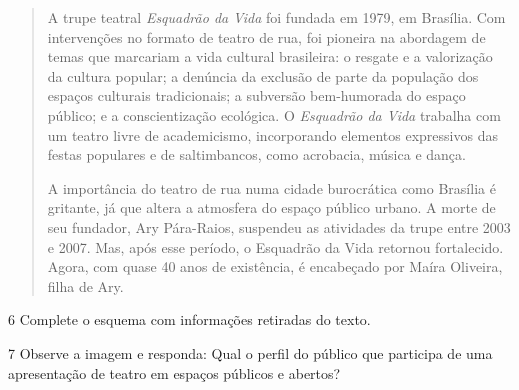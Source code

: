 \begin{quote}
A trupe teatral \emph{Esquadrão da} \emph{Vida} foi fundada em 1979, em
Brasília. Com intervenções no formato de teatro de rua, foi pioneira na
abordagem de temas que marcariam a vida cultural brasileira: o resgate e
a valorização da cultura popular; a denúncia da exclusão de parte da
população dos espaços culturais tradicionais; a subversão bem-humorada
do espaço público; e a conscientização ecológica. O \emph{Esquadrão da
Vida} trabalha com um teatro livre de academicismo, incorporando
elementos expressivos das festas populares e de saltimbancos, como
acrobacia, música e dança.

A importância do teatro de rua numa cidade burocrática como Brasília é
gritante, já que altera a atmosfera do espaço público urbano. A morte de
seu fundador, Ary Pára-Raios, suspendeu as atividades da trupe entre
2003 e 2007. Mas, após esse período, o Esquadrão da Vida retornou
fortalecido. Agora, com quase 40 anos de existência, é encabeçado por
Maíra Oliveira, filha de Ary.

\end{quote}

\num{6}  Complete o esquema com informações retiradas do texto.



\num{7} Observe a imagem e responda: Qual o perfil do público que participa de uma apresentação de teatro em espaços públicos e abertos?

%


